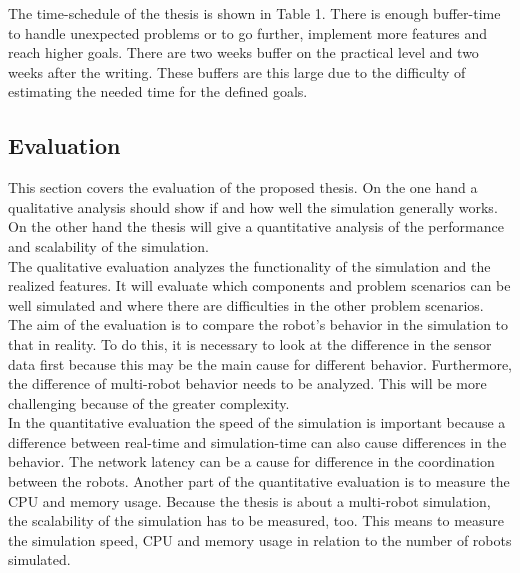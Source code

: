 \documentclass[a4paper,11pt]{article}
\begin{document}
The time-schedule of the thesis is shown in Table 1. There is enough buffer-time to handle unexpected problems or to go further, implement more features and reach higher goals. There are two weeks buffer on the practical level and two weeks after the writing. These buffers are this large due to the difficulty of estimating the needed time for the defined goals.

\subsection{Evaluation}
This section covers the evaluation of the proposed thesis. On the one hand a qualitative analysis should show if and how well the simulation generally works. On the other hand the thesis will give a quantitative analysis of the performance and scalability of the simulation.\\
The qualitative evaluation analyzes the functionality of the simulation and the realized features. It will evaluate which components and problem scenarios can be well simulated and where there are difficulties in the other problem scenarios. The aim of the evaluation is to compare the robot's behavior in the simulation to that in reality. To do this, it is necessary to look at the difference in the sensor data first because this may be the main cause for different behavior. Furthermore, the difference of multi-robot behavior needs to be analyzed. This will be more challenging because of the greater complexity.\\
In the quantitative evaluation the speed of the simulation is important because a difference between real-time and simulation-time can also cause differences in the behavior. The network latency can be a cause for difference in the coordination between the robots. Another part of the quantitative evaluation is to measure the CPU and memory usage. Because the thesis is about a multi-robot simulation, the scalability of the simulation has to be measured, too. This means to measure the simulation speed, CPU and memory usage in relation to the number of robots simulated.
\end{document}
